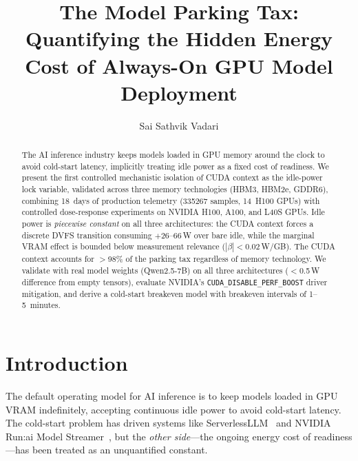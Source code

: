 \documentclass[sigconf,nonacm]{acmart}
\begin{document}
\title{The Model Parking Tax: Quantifying the Hidden Energy Cost of Always-On GPU Model Deployment}

\author{Sai Sathvik Vadari}

\begin{abstract}
The AI inference industry keeps models loaded in GPU memory around the clock to avoid cold-start latency, implicitly treating idle power as a fixed cost of readiness. We present the first controlled mechanistic isolation of CUDA context as the idle-power lock variable, validated across three memory technologies (HBM3, HBM2e, GDDR6), combining 18~days of production telemetry (\num{335267} samples, 14~H100 GPUs) with controlled dose-response experiments on NVIDIA H100, A100, and L40S GPUs. Idle power is \emph{piecewise constant} on all three architectures: the CUDA context forces a discrete DVFS transition consuming $+26$--$66$\,W over bare idle, while the marginal VRAM effect is bounded below measurement relevance ($|\beta| < 0.02$\,W/GB). The CUDA context accounts for $>$98\% of the parking tax regardless of memory technology. We validate with real model weights (Qwen2.5-7B) on all three architectures ($<$0.5\,W difference from empty tensors), evaluate NVIDIA's \texttt{CUDA\_DISABLE\_PERF\_BOOST} driver mitigation, and derive a cold-start breakeven model with breakeven intervals of 1--5~minutes.
\end{abstract}


\maketitle

\section{Introduction}

The default operating model for AI inference is to keep models loaded in GPU VRAM indefinitely, accepting continuous idle power to avoid cold-start latency. The cold-start problem has driven systems like ServerlessLLM~\cite{serverlessllm} and NVIDIA Run:ai Model Streamer~\cite{nvidia-streamer}, but the \emph{other side}---the ongoing energy cost of readiness---has been treated as an unquantified constant.
\end{document}
